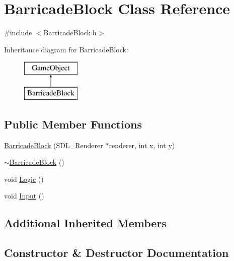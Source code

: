 \hypertarget{class_barricade_block}{}\section{Barricade\+Block Class Reference}
\label{class_barricade_block}


{\ttfamily \#include $<$Barricade\+Block.\+h$>$}

Inheritance diagram for Barricade\+Block\+:\begin{figure}[H]
\begin{center}
\leavevmode
\includegraphics[height=2.000000cm]{class_barricade_block}
\end{center}
\end{figure}
\subsection*{Public Member Functions}
\begin{DoxyCompactItemize}
\item 
\mbox{\hyperlink{class_barricade_block_a497dcd5806e7a26f3c4d5e55e5a9be61}{Barricade\+Block}} (S\+D\+L\+\_\+\+Renderer $\ast$renderer, int x, int y)
\item 
\mbox{\hyperlink{class_barricade_block_ae4a2910fc259d532cb07179b8da76c4e}{$\sim$\+Barricade\+Block}} ()
\item 
void \mbox{\hyperlink{class_barricade_block_ac01d18a8afea6f0b15c7ec7b0167c7f1}{Logic}} ()
\item 
void \mbox{\hyperlink{class_barricade_block_adc4d1d90b1d7ad2a6b043aef0a9886d2}{Input}} ()
\end{DoxyCompactItemize}
\subsection*{Additional Inherited Members}


\subsection{Constructor \& Destructor Documentation}
\mbox{\label{class_barricade_block_a497dcd5806e7a26f3c4d5e55e5a9be61}} 
